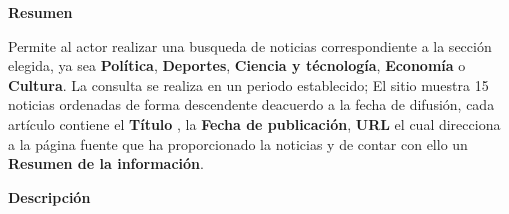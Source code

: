 

\begin{large}
	\textbf{Resumen}\\
\end{large}

Permite al actor realizar una busqueda de noticias correspondiente a la sección elegida,
ya sea \textbf{Política}, \textbf{Deportes}, \textbf{Ciencia y técnología}, \textbf{Economía}
o \textbf{Cultura}. La consulta se realiza en un periodo establecido; El sitio muestra 15 
noticias ordenadas de forma descendente deacuerdo a la fecha de difusión, cada artículo 
contiene el \textbf{Título} , la \textbf{Fecha de publicación}, \textbf{URL} el cual direcciona 
a la página fuente que ha proporcionado la noticias y de contar con ello  un
\textbf{Resumen de la información}.\\

\begin{large}
	\textbf{Descripción}\\
\end{large}




